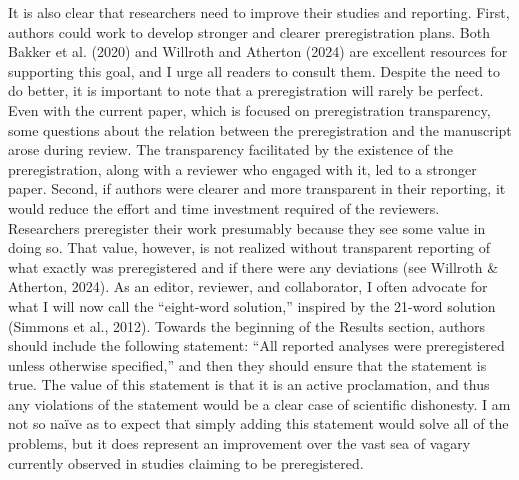 \documentclass[authordate, meta]{jote-new-article}
\begin{document}
	It is also clear that researchers need to improve their studies and reporting. First, authors could work to develop stronger and clearer preregistration plans. Both Bakker et al. (2020) and Willroth and Atherton (2024) are excellent resources for supporting this goal, and I urge all readers to consult them. Despite the need to do better, it is important to note that a preregistration will rarely be perfect. Even with the current paper, which is focused on preregistration transparency, some questions about the relation between the preregistration and the manuscript arose during review. The transparency facilitated by the existence of the preregistration, along with a reviewer who engaged with it, led to a stronger paper. Second, if authors were clearer and more transparent in their reporting, it would reduce the effort and time investment required of the reviewers. Researchers preregister their work presumably because they see some value in doing so. That value, however, is not realized without transparent reporting of what exactly was preregistered and if there were any deviations (see Willroth \& Atherton, 2024). As an editor, reviewer, and collaborator, I often advocate for what I will now call the “eight-word solution,” inspired by the 21-word solution (Simmons et al., 2012). Towards the beginning of the Results section, authors should include the following statement: “All reported analyses were preregistered unless otherwise specified,” and then they should ensure that the statement is true. The value of this statement is that it is an active proclamation, and thus any violations of the statement would be a clear case of scientific dishonesty. I am not so naïve as to expect that simply adding this statement would solve all of the problems, but it does represent an improvement over the vast sea of vagary currently observed in studies claiming to be preregistered.
\end{document}
